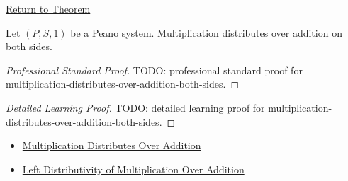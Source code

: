 \newpage
{}
\label{prf:multiplication-distributes-over-addition-both-sides}

\begin{remark*}[Return]
\hyperref[thm:multiplication-distributes-over-addition-both-sides]{Return to Theorem}
\end{remark*}

\begin{theorem*}
Let $(P,S,1)$ be a Peano system. Multiplication distributes over addition on
both sides.
\end{theorem*}

\begin{proof}[Professional Standard Proof]
\LRAProofBodyStart
TODO: professional standard proof for multiplication-distributes-over-addition-both-sides.
\end{proof}

\begin{proof}[Detailed Learning Proof]
\LRAProofBodyStart
TODO: detailed learning proof for multiplication-distributes-over-addition-both-sides.
\end{proof}

\begin{remark*}
\end{remark*}

\begin{dependencies}
\begin{itemize}
  \item \hyperref[thm:multiplication-distributes-over-addition]{Multiplication Distributes Over Addition}
  \item \hyperref[thm:left-distributivity-of-multiplication-over-addition]{Left Distributivity of Multiplication Over Addition}
\end{itemize}
\end{dependencies}

\clearpage
